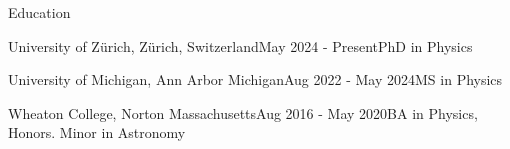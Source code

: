 \documentclass{resume} %
\begin{document}
\begin{rSection}{Education}
    \begin{rSubsection}
        {University of Zürich, Zürich, Switzerland}{May 2024 - Present}{PhD in Physics}{}
        
    \end{rSubsection}
    
    \begin{rSubsection}
        {University of Michigan, Ann Arbor Michigan}{Aug 2022 - May 2024}{MS in Physics}{}
        
    \end{rSubsection}

\begin{rSubsection}
    {Wheaton College, Norton Massachusetts}{Aug 2016 - May 2020}{BA in Physics, Honors. Minor in Astronomy}{}
\end{rSubsection}


\end{rSection}
\end{document}
